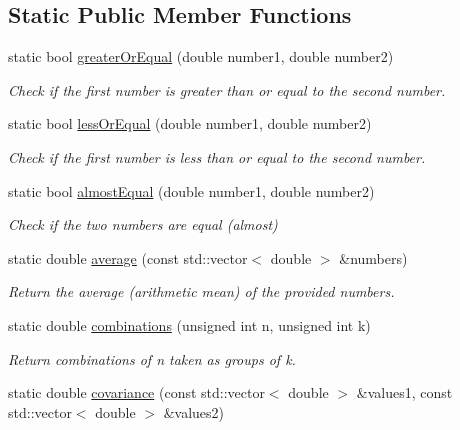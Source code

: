 \subsection*{Static Public Member Functions}
\begin{DoxyCompactItemize}
\item 
static bool \hyperlink{classmultiscale_1_1Numeric_a13ae1e2b35654937bed4c19e776ccdb5}{greater\-Or\-Equal} (double number1, double number2)
\begin{DoxyCompactList}\small\item\em Check if the first number is greater than or equal to the second number. \end{DoxyCompactList}\item 
static bool \hyperlink{classmultiscale_1_1Numeric_a7f21159a23c71c1d37e1c487e9ff815c}{less\-Or\-Equal} (double number1, double number2)
\begin{DoxyCompactList}\small\item\em Check if the first number is less than or equal to the second number. \end{DoxyCompactList}\item 
static bool \hyperlink{classmultiscale_1_1Numeric_a996dda9f7361be59b4614eace0b93f24}{almost\-Equal} (double number1, double number2)
\begin{DoxyCompactList}\small\item\em Check if the two numbers are equal (almost) \end{DoxyCompactList}\item 
static double \hyperlink{classmultiscale_1_1Numeric_a35c4c545f6ef78c31c94a85b9f070ee5}{average} (const std\-::vector$<$ double $>$ \&numbers)
\begin{DoxyCompactList}\small\item\em Return the average (arithmetic mean) of the provided numbers. \end{DoxyCompactList}\item 
static double \hyperlink{classmultiscale_1_1Numeric_a270ee8ecb4c1220dcbb018023f5931a0}{combinations} (unsigned int n, unsigned int k)
\begin{DoxyCompactList}\small\item\em Return combinations of n taken as groups of k. \end{DoxyCompactList}\item 
static double \hyperlink{classmultiscale_1_1Numeric_a574e8c0824ad8e441898e4857816585a}{covariance} (const std\-::vector$<$ double $>$ \&values1, const std\-::vector$<$ double $>$ \&values2)

\end{DoxyCompactItemize}
